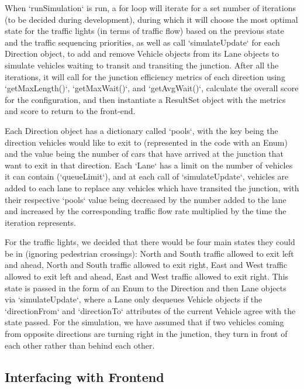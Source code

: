 \documentclass{article}
\begin{document}
When `runSimulation` is run, a for loop will iterate for a set number of iterations (to be decided during development), during 
which it will choose the most optimal state for the traffic lights (in terms of traffic flow) based on the previous state and the 
traffic sequencing priorities, as well as call `simulateUpdate` for each Direction object, to add and remove Vehicle objects from 
its Lane objects to simulate vehicles waiting to transit and transiting the junction. After all the iterations, it will call for 
the junction efficiency metrics of each direction using `getMaxLength()`, `getMaxWait()`, and `getAvgWait()`, calculate the 
overall score for the configuration, and then instantiate a ResultSet object with the metrics and score to return to the front-end.

Each Direction object has a dictionary called `pools`, with the key being the direction vehicles would like to exit to (represented 
in the code with an Enum) and the value being the number of cars that have arrived at the junction that want to exit in that 
direction. Each `Lane` has a limit on the number of vehicles it can contain (`queueLimit`), and at each call of `simulateUpdate`, 
vehicles are added to each lane to replace any vehicles which have transited the junction, with their respective `pools` value 
being decreased by the number added to the lane and increased by the corresponding traffic flow rate multiplied by the time the 
iteration represents.

For the traffic lights, we decided that there would be four main states they could be in (ignoring pedestrian crossings): North and 
South traffic allowed to exit left and ahead, North and South traffic allowed to exit right, East and West traffic allowed to exit 
left and ahead, East and West traffic allowed to exit right. This state is passed in the form of an Enum to the Direction and then 
Lane objects via `simulateUpdate`, where a Lane only dequeues Vehicle objects if the `directionFrom` and `directionTo` attributes 
of the current Vehicle agree with the state passed. For the simulation, we have assumed that if two vehicles coming from opposite 
directions are turning right in the junction, they turn in front of each other rather than behind each other.


\subsection{Interfacing with Frontend}
\end{document}
